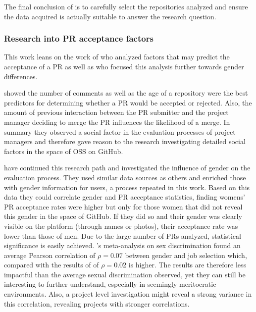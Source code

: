 The final conclusion of \citeauthor{perils-github:2015} is to carefully select the repositories analyzed and ensure the data acquired is actually suitable to answer the research question.

\subsubsection{Research into \ac{PR} acceptance factors}

This work leans on the work of \citeauthor{Tsay:2014:IST:2568225.2568315} who analyzed factors that may predict the acceptance of a \ac{PR} as well as  \citeauthor{genderdiff:2016} who focused this analysis further towards gender differences.

\citeauthor{Tsay:2014:IST:2568225.2568315} showed the number of comments as well as the age of a repository were the best predictors for determining whether a \ac{PR} would be accepted or rejected. Also, the amount of previous interaction between the \ac{PR} submitter and the project manager deciding to merge the \ac{PR} influences the likelihood of a merge. In summary they observed a social factor in the evaluation processes of project managers and therefore gave reason to the research investigating detailed social factors in the space of \ac{OSS} on GitHub.

\citeauthor{genderdiff:2016} have continued this research path and investigated the influence of gender on the evaluation process. They used similar data sources as others and enriched those with gender information for users, a process repeated in this work. Based on this data they could correlate gender and \ac{PR} acceptance statistics, finding womens' \ac{PR} acceptance rates were higher but only for those women that did not reveal this gender in the space of GitHub. If they did so and their gender was clearly visible on the platform (through names or photos), their acceptance rate was lower than those of men. Due to the large number of \ac{PR}s analyzed, statistical significance is easily achieved. \citeauthor{Davison2000225}'s meta-analysis on sex discrimination found an average Pearson correlation of $\rho = 0.07$ between gender and job selection which, compared with the results of \citeauthor{genderdiff:2016} of $\rho = 0.02$ is higher. The results are therefore less impactful than the average sexual discrimination observed, yet they can still be interesting to further understand, especially in seemingly meritocratic environments. Also, a project level investigation might reveal a strong variance in this correlation, revealing projects with stronger correlations.




